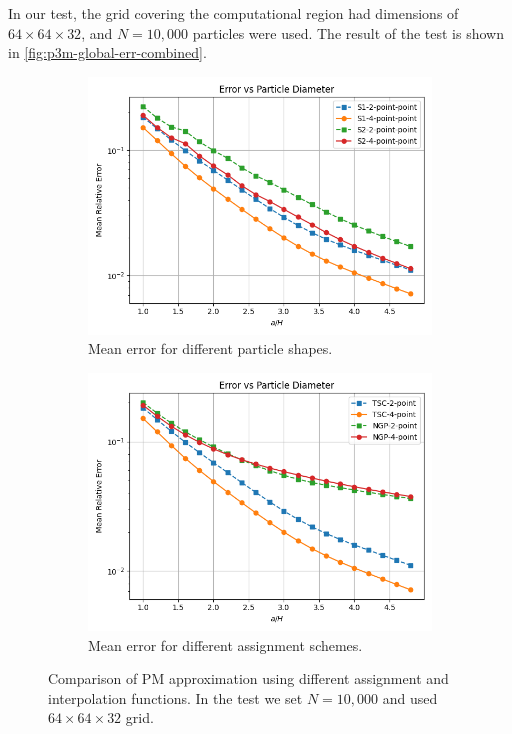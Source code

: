 In our test, the grid covering the computational region had dimensions of $64\times 64\times 32$, and $N=10{,}000$ particles were used.
The result of the test is shown in \autoref{fig:p3m-global-err-combined}.
\begin{figure}[htp]
    \centering
    \begin{subfigure}[b]{0.48\textwidth}
        \centering
        \includegraphics[width=\textwidth]{chapters/p3m-method/img/err_vs_part_diam_p3m.png}
        \caption{Mean error for different particle shapes.}
        \label{fig:reference-force-approx-different-shapes-sub}
    \end{subfigure}
    \hfill
    \begin{subfigure}[b]{0.48\textwidth}
        \centering
        \includegraphics[width=\textwidth]{chapters/p3m-method/img/no-cic.png}
        \caption{Mean error for different assignment schemes.}
        \label{fig:reference-force-error-different-schemes-sub}
    \end{subfigure}
    \caption{Comparison of PM approximation using different assignment and interpolation functions.
    In the test we set $N=10{,}000$ and used $64\times 64\times 32$ grid.
    }
    \label{fig:p3m-global-err-combined}
\end{figure}
